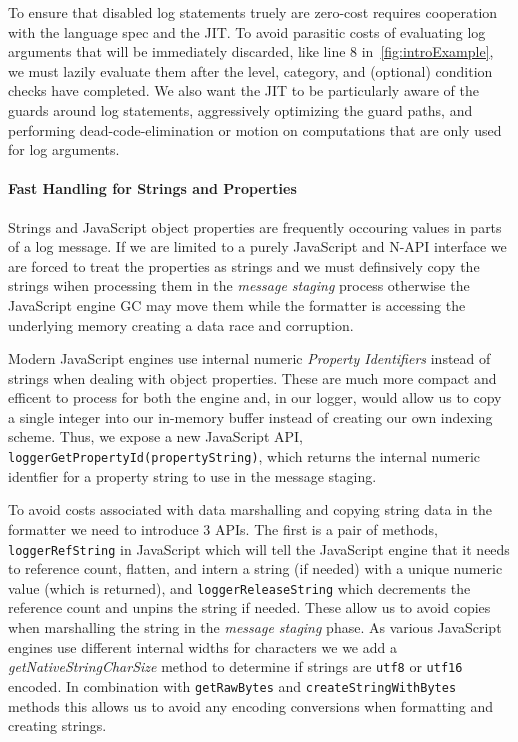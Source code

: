 To ensure that disabled log statements truely are zero-cost requires cooperation 
with the language spec and the JIT. To avoid parasitic costs of evaluating log 
arguments that will be immediately discarded, like line 8 in~\autoref{fig:introExample}, 
we must lazily evaluate them after the level, category, and (optional) condition 
checks have completed. We also want the JIT to be particularly aware of the guards 
around log statements, aggressively optimizing the guard paths, and performing 
dead-code-elimination or motion on computations that are only used for log arguments.

\paragraph{Fast Handling for Strings and Properties}
\noindent
Strings and JavaScript object properties are frequently occouring values in 
parts of a log message. If we are limited to a purely JavaScript and N-API 
interface we are forced to treat the properties as strings and we must 
definsively copy the strings wihen processing them in the \emph{message staging} 
process otherwise the JavaScript engine GC may move them while the formatter is 
accessing the underlying memory creating a data race and corruption. 

Modern JavaScript engines use internal numeric \emph{Property Identifiers} 
instead of strings when dealing with object properties. These are much more 
compact and efficent to process for both the engine and, in our logger, would 
allow us to copy a single integer into our in-memory buffer instead of creating 
our own indexing scheme. Thus, we expose a new 
JavaScript API, \texttt{loggerGetPropertyId(propertyString)}, which returns the 
internal numeric identfier for a property string to use in the message staging. 

To avoid costs associated with data marshalling and copying string data 
in the formatter we need to introduce 3 APIs. The first is a pair of 
methods, \texttt{loggerRefString} in JavaScript which will tell the JavaScript 
engine that it needs to reference count, flatten, and intern a string (if needed) 
with a unique numeric value (which is returned), and \texttt{loggerReleaseString} 
which decrements the reference count and unpins the string if needed. These 
allow us to avoid copies when marshalling the string in the \emph{message staging} 
phase. As various JavaScript engines use different internal widths for characters 
we we add a \emph{getNativeStringCharSize} method to determine if strings 
are \texttt{utf8} or \texttt{utf16} encoded. In combination with \texttt{getRawBytes} 
and \texttt{createStringWithBytes} methods this allows us to avoid any encoding 
conversions when formatting and creating strings. 

